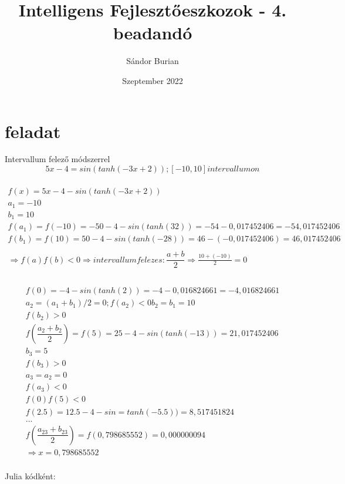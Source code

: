 \documentclass{article}
\title{Intelligens Fejlesztőeszkozok - 4. beadandó}
\author{Sándor Burian}
\date{Szeptember 2022}
\begin{document}
\maketitle

\section{feladat}

Intervallum felező módszerrel 
\begin{equation}
    5x-4 = sin(tanh(-3x+2)); [-10,10] intervallumon 
\end{equation}


\begin{multline}
\\
f(x) = 5x-4-sin(tanh(-3x+2)) \\
a_1 = -10 \\
b_1 = 10\\
f(a_1)=f(-10)=-50-4-sin(tanh(32)) = -54 - 0,017452406 = -54,017452406 \\
f(b_1)=f(10) = 50-4 - sin(tanh(-28)) = 46 - (-0,017452406) = 46,017452406 \\
\\
\Rightarrow f(a)f(b)<0 \Rightarrow intervallumfelezes: \dfrac{a+b}{2} \Rightarrow \frac{10+(-10)}{2} = 0 \\
\end{multline}

\begin{multline}
\\
f(0) = -4-sin(tanh(2)) = -4-0,016824661 = -4,016824661\\
a_2 = (a_1 + b_1)/2 = 0; f(a_2) < 0
b_2 = b_1=10\\
f(b_2) >0\\
f(\dfrac{a_2+b_2}{2}) = f(5) = 25-4-sin(tanh(-13)) = 21,017452406 \\
b_3 = 5\\
f(b_3) > 0 \\
a_3 = a_2 = 0 \\
f(a_3)<0\\
f(0)f(5) < 0 \\
f(2.5) = 12.5-4-sin=tanh(-5.5)) = 8,517451824 \\
...\\
f(\dfrac{a_23 + b_23}{2}) = f(0,798685552) = 0,000000094 \\
\Rightarrow x = 0,798685552\\
\end{multline}

Julia kódként:
\end{document}
